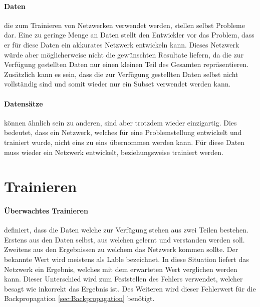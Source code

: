 
\paragraph{Daten} die zum Trainieren von Netzwerken verwendet werden, stellen selbst Probleme dar.
Eine zu geringe Menge an Daten stellt den Entwickler vor das Problem, dass er für diese Daten ein akkurates Netzwerk entwickeln kann.
Dieses Netzwerk würde aber möglicherweise nicht die gewünschten Resultate liefern, da die zur Verfügung gestellten Daten nur einen kleinen Teil des Gesamten repräsentieren.
Zusätzlich kann es sein, dass die zur Verfügung gestellten Daten selbst nicht vollständig sind und somit wieder nur ein Subset verwendet werden kann.

\paragraph{Datensätze} können ähnlich sein zu anderen, sind aber trotzdem wieder einzigartig. 
Dies bedeutet, dass ein Netzwerk, welches für eine Problemstellung entwickelt und trainiert wurde, nicht eins zu eins übernommen werden kann.
Für diese Daten muss wieder ein Netzwerk entwickelt, beziehungsweise trainiert werden.

\section{Trainieren}

\paragraph{Überwachtes Trainieren} definiert, dass die Daten welche zur Verfügung stehen aus zwei Teilen bestehen.
Erstens aus den Daten selbst, aus welchen gelernt und verstanden werden soll.
Zweitens aus den Ergebnissen zu welchem das Netzwerk kommen sollte.
Der bekannte Wert wird meistens als Lable bezeichnet. 
In diese Situation liefert das Netzwerk ein Ergebnis, welches mit dem erwarteten Wert verglichen werden kann.
Dieser Unterschied wird zum Feststellen des Fehlers verwendet, welcher besagt wie inkorrekt das Ergebnis ist.
Des Weiteren wird dieser Fehlerwert für die Backpropagation \ref{sec:Backpropagation} benötigt.

